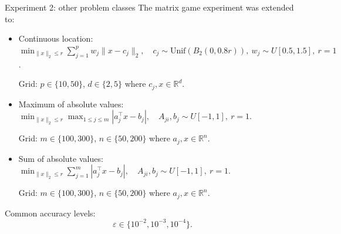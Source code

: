 \documentclass[aspectratio=169]{beamer}
\begin{document}
\begin{frame}{Experiment 2: other problem classes}
\small
  The matrix game experiment was extended to:
  \begin{itemize}
    \item Continuous location:
    \(\min_{\|x\|_2\le r}\sum_{j=1}^p w_j\|x-c_j\|_2,\quad c_j\sim \mathrm{Unif}(B_2(0,0.8r)),\ w_j\sim U[0.5,1.5],\ r=1\).\par
    Grid: \(p\in\{10,50\}\), \(d\in\{2,5\}\) where \(c_j,x\in\mathbb{R}^d\).
    \item Maximum of absolute values:
    \(\min_{\|x\|_2\le r}\max_{1\le j\le m}|a_j^\top x-b_j|,\quad A_{ji}, b_j\sim U[-1,1],\ r=1\).\par
    Grid: \(m\in\{100,300\}\), \(n\in\{50,200\}\) where \(a_j,x\in\mathbb{R}^n\).
    \item Sum of absolute values:
    \(\min_{\|x\|_2\le r}\sum_{j=1}^m|a_j^\top x-b_j|,\quad A_{ji}, b_j\sim U[-1,1],\ r=1\).\par
    Grid: \(m\in\{100,300\}\), \(n\in\{50,200\}\) where \(a_j,x\in\mathbb{R}^n\).
  \end{itemize}

  \vspace{0.5em}
  Common accuracy levels:
  \[
      \varepsilon\in\{10^{-2},10^{-3},10^{-4}\}.
  \]

\end{frame}
\end{document}
